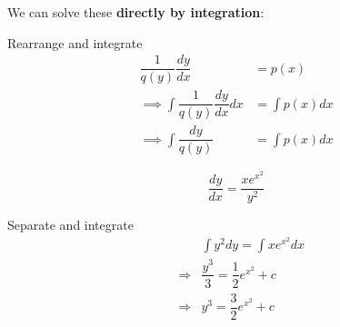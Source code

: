 We can solve these \textbf{directly by integration}:

Rearrange and integrate
\begin{align*}
\dfrac{1}{q(y)} \dfrac{dy}{dx}  & =  p(x)  \\
\implies \int \dfrac{1}{q(y)} \dfrac{dy}{dx}dx & = \int p(x)dx  \\
\implies \int \dfrac{dy}{q(y)} & =  \int p(x)dx
\end{align*}

\begin{example}
 \[
  \dfrac{dy}{dx} = \dfrac{xe^{x^2}}{y^2}
 \]

 Separate and integrate
 \begin{eqnarray*}
  && \int y^2 dy = \int x e^{x^2} dx\\
  &\Rightarrow& \dfrac{y^3}{3} = \dfrac{1}{2} e^{x^2} + c\\
  &\Rightarrow& {y^3} = \dfrac{3}{2} e^{x^2} + c 
 \end{eqnarray*}

\end{example}

